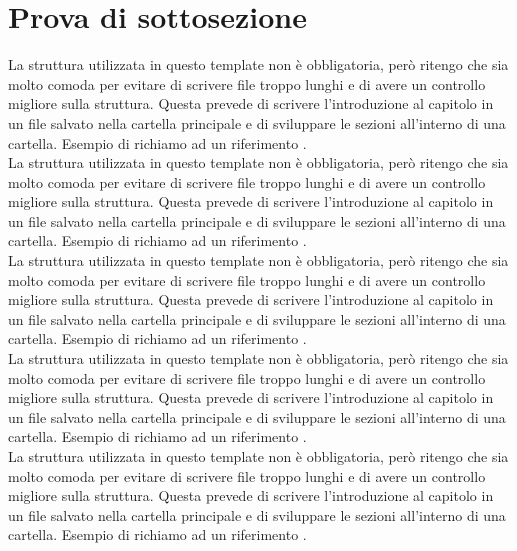 \section{Prova di sottosezione}
La struttura utilizzata in questo template non è obbligatoria, però ritengo che sia molto comoda per evitare di scrivere file troppo lunghi e di avere un controllo migliore sulla struttura. Questa prevede di scrivere l'introduzione al capitolo in un file salvato nella cartella principale e di sviluppare le sezioni all'interno di una cartella. Esempio di richiamo ad un riferimento \cite{Latex-impara-latex}.\\

\noindent
La struttura utilizzata in questo template non è obbligatoria, però ritengo che sia molto comoda per evitare di scrivere file troppo lunghi e di avere un controllo migliore sulla struttura. Questa prevede di scrivere l'introduzione al capitolo in un file salvato nella cartella principale e di sviluppare le sezioni all'interno di una cartella. Esempio di richiamo ad un riferimento \cite{Latex-impara-latex}.\\

\noindent
La struttura utilizzata in questo template non è obbligatoria, però ritengo che sia molto comoda per evitare di scrivere file troppo lunghi e di avere un controllo migliore sulla struttura. Questa prevede di scrivere l'introduzione al capitolo in un file salvato nella cartella principale e di sviluppare le sezioni all'interno di una cartella. Esempio di richiamo ad un riferimento \cite{Latex-impara-latex}.\\

\noindent
La struttura utilizzata in questo template non è obbligatoria, però ritengo che sia molto comoda per evitare di scrivere file troppo lunghi e di avere un controllo migliore sulla struttura. Questa prevede di scrivere l'introduzione al capitolo in un file salvato nella cartella principale e di sviluppare le sezioni all'interno di una cartella. Esempio di richiamo ad un riferimento \cite{Latex-impara-latex}.\\

\noindent
La struttura utilizzata in questo template non è obbligatoria, però ritengo che sia molto comoda per evitare di scrivere file troppo lunghi e di avere un controllo migliore sulla struttura. Questa prevede di scrivere l'introduzione al capitolo in un file salvato nella cartella principale e di sviluppare le sezioni all'interno di una cartella. Esempio di richiamo ad un riferimento \cite{Latex-impara-latex}.\\

